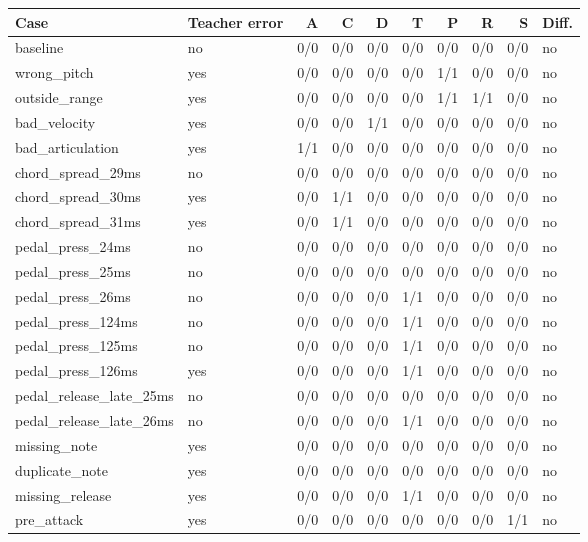 \begin{tabular}{llrrrrrrrl}
\hline
Case & Teacher error & A & C & D & T & P & R & S & Diff. \\
\hline
baseline & no & 0/0 & 0/0 & 0/0 & 0/0 & 0/0 & 0/0 & 0/0 & no \\
wrong\_pitch & yes & 0/0 & 0/0 & 0/0 & 0/0 & 1/1 & 0/0 & 0/0 & no \\
outside\_range & yes & 0/0 & 0/0 & 0/0 & 0/0 & 1/1 & 1/1 & 0/0 & no \\
bad\_velocity & yes & 0/0 & 0/0 & 1/1 & 0/0 & 0/0 & 0/0 & 0/0 & no \\
bad\_articulation & yes & 1/1 & 0/0 & 0/0 & 0/0 & 0/0 & 0/0 & 0/0 & no \\
chord\_spread\_29ms & no & 0/0 & 0/0 & 0/0 & 0/0 & 0/0 & 0/0 & 0/0 & no \\
chord\_spread\_30ms & yes & 0/0 & 1/1 & 0/0 & 0/0 & 0/0 & 0/0 & 0/0 & no \\
chord\_spread\_31ms & yes & 0/0 & 1/1 & 0/0 & 0/0 & 0/0 & 0/0 & 0/0 & no \\
pedal\_press\_24ms & no & 0/0 & 0/0 & 0/0 & 0/0 & 0/0 & 0/0 & 0/0 & no \\
pedal\_press\_25ms & no & 0/0 & 0/0 & 0/0 & 0/0 & 0/0 & 0/0 & 0/0 & no \\
pedal\_press\_26ms & no & 0/0 & 0/0 & 0/0 & 1/1 & 0/0 & 0/0 & 0/0 & no \\
pedal\_press\_124ms & no & 0/0 & 0/0 & 0/0 & 1/1 & 0/0 & 0/0 & 0/0 & no \\
pedal\_press\_125ms & no & 0/0 & 0/0 & 0/0 & 1/1 & 0/0 & 0/0 & 0/0 & no \\
pedal\_press\_126ms & yes & 0/0 & 0/0 & 0/0 & 1/1 & 0/0 & 0/0 & 0/0 & no \\
pedal\_release\_late\_25ms & no & 0/0 & 0/0 & 0/0 & 0/0 & 0/0 & 0/0 & 0/0 & no \\
pedal\_release\_late\_26ms & no & 0/0 & 0/0 & 0/0 & 1/1 & 0/0 & 0/0 & 0/0 & no \\
missing\_note & yes & 0/0 & 0/0 & 0/0 & 0/0 & 0/0 & 0/0 & 0/0 & no \\
duplicate\_note & yes & 0/0 & 0/0 & 0/0 & 0/0 & 0/0 & 0/0 & 0/0 & no \\
missing\_release & yes & 0/0 & 0/0 & 0/0 & 1/1 & 0/0 & 0/0 & 0/0 & no \\
pre\_attack & yes & 0/0 & 0/0 & 0/0 & 0/0 & 0/0 & 0/0 & 1/1 & no \\

\end{tabular}
